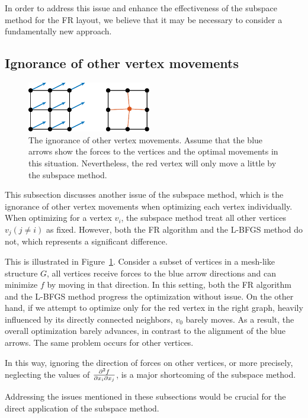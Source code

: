 \documentclass[dvipdfmx,journal]{IEEEtran}
\begin{document}
In order to address this issue and enhance the effectiveness of the subspace method for the FR layout, we believe that it may be necessary to consider a fundamentally new approach.

\subsection{Ignorance of other vertex movements}\label{ssec:ignorance}

\begin{figure}[t]
  \centering
  \includegraphics[height=2.2cm]{whyRSNfail2/whyRSNfail2.pdf}
  \caption{
    The ignorance of other vertex movements. Assume that the blue arrows show the forces to the vertices and the optimal movements in this situation. Nevertheless, the red vertex will only move a little by the subspace method.
  }
  \label{fig:whyRSNfail2}
\end{figure}

This subsection discusses another issue of the subspace method, which is the ignorance of other vertex movements when optimizing each vertex individually.
When optimizing for a vertex $v_i$, the subspace method treat all other vertices $v_j (j \neq i)$ as fixed. However, both the FR algorithm and the L-BFGS method do not, which represents a significant difference.

This is illustrated in Figure~\ref{fig:whyRSNfail2}.
Consider a subset of vertices in a mesh-like structure $G$, all vertices receive forces to the blue arrow directions and can minimize $f$ by moving in that direction.
In this setting, both the FR algorithm and the L-BFGS method progress the optimization without issue.
On the other hand, if we attempt to optimize only for the red vertex in the right graph, heavily influenced by its directly connected neighbors, $v_0$ barely moves.
As a result, the overall optimization barely advances, in contrast to the alignment of the blue arrows.
The same problem occurs for other vertices.

In this way, ignoring the direction of forces on other vertices, or more precisely, neglecting the values of $\pdv{f}{x_i}{x_j}$, is a major shortcoming of the subspace method.

Addressing the issues mentioned in these subsections would be crucial for the direct application of the subspace method.
\end{document}
